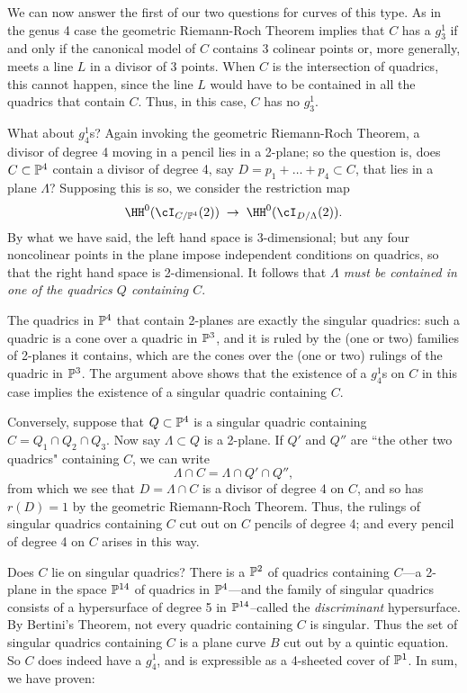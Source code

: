 We can now answer the first of our two questions for curves of this type. As in the genus 4 case the geometric Riemann-Roch Theorem implies that $C$ has a $g^1_3$ if and only if the canonical model of $C$ contains 3 colinear points or, more generally, meets a line $L$ in a divisor of 3 points. When $C$ is the intersection of quadrics, this cannot happen, since the line $L$ would have to be contained in all the quadrics that contain $C$. Thus, in this case, 
$C$ has no $g^1_3$.

What about $g^1_4$s? Again invoking the geometric Riemann-Roch Theorem, a divisor of degree 4 moving in a pencil lies in a 2-plane; so the question is, does $C \subset \PP^4$ contain a divisor of degree 4, say $D = p_1+\dots +p_4 \subset C$, that lies in a plane $\Lambda$? Supposing this is so, we consider the restriction map
$$
\HH^0(\cI_{C/\PP^4}(2)) \; \to \; \HH^0(\cI_{D/\Lambda}(2)).
$$
By what we have said, the left hand space is 3-dimensional; but any four noncolinear points in the plane  impose independent conditions on quadrics,  so that the right hand space is 2-dimensional. It follows that \emph{$\Lambda$ must be contained in one of the quadrics $Q$ containing $C$}. 

The quadrics in $\PP^4$ that contain 2-planes are exactly the singular quadrics: such a quadric is a cone over a quadric in $\PP^3$, and it is ruled by the (one or two) families of 2-planes it contains, which are the cones over the (one or two) rulings of the quadric in $\PP^3$. The argument above shows that the existence of a $g_4^1$s on $C$ in this case implies the existence of a singular quadric containing $C$.

Conversely, suppose that $Q \subset \PP^4$ is a singular quadric containing $C = Q_1 \cap Q_2 \cap Q_3$. Now say $\Lambda \subset Q$ is  a 2-plane. If $Q'$ and $Q''$ are ``the other two quadrics" containing $C$, we can write
$$
\Lambda \cap C = \Lambda \cap Q' \cap Q'', 
$$ 
from which we see that $D = \Lambda \cap C$ is a divisor of degree 4 on $C$, and so has $r(D) = 1$ by the geometric Riemann-Roch Theorem. Thus, the rulings of  singular quadrics containing $C$ cut out on $C$ pencils of degree 4; and every pencil of degree 4 on $C$ arises in this way.

Does $C$ lie on singular quadrics? There is a $\PP^2$ of quadrics containing $C$---a 2-plane in the space $\PP^{14}$ of quadrics in $\PP^4$---and the family of singular quadrics  consists of a  hypersurface of degree 5 in $\PP^{14}$--called the \emph{discriminant} hypersurface. By Bertini's Theorem, not every quadric containing $C$ is singular. Thus the set of singular quadrics containing $C$ is a plane curve $B$ cut out by a quintic equation. So $C$ does indeed have a $g^1_4$, and is expressible as a 4-sheeted cover of $\PP^1$. In sum, we have proven:

